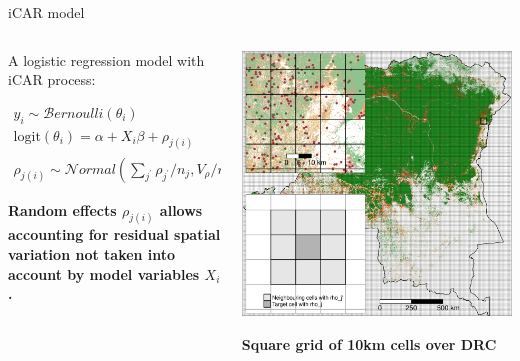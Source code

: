 \documentclass[10pt,table,dvipsnames,compress]{beamer}
\begin{document}
\begin{frame}[label={sec:org165f56f}]{iCAR model}
\begin{columns}
\begin{column}{0.5\columnwidth}
A logistic regression model with iCAR process:

\begin{equation*}
\begin{split}
  y_i \sim \mathcal{B}ernoulli(\theta_i)\\
  \text{logit}(\theta_i) = \alpha + X_i \beta + \rho_{j(i)}\\
  \rho_{j(i)} \sim \mathcal{N}ormal(\sum_{j^{\prime}} \rho_{j^{\prime}} / n_j,V_{\rho} / n_j)
\end{split}
\end{equation*}

\textbf{Random effects \(\rho_{j(i)}\) allows accounting for residual spatial variation not taken into account by model variables \(X_i\).}
\end{column}

\begin{column}{0.5\columnwidth}
\begin{center}
\includegraphics[width=\textwidth]{figs/sm/grid.png}
\end{center}

\centering \textbf{Square grid of 10km cells over DRC}
\end{column}
\end{columns}
\end{frame}
\end{document}
